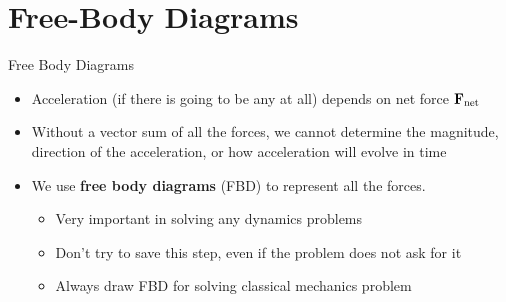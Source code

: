 \documentclass[12pt,compress,aspectratio=169]{beamer}
\newcommand{\pic}[2]{\texttt{[image: \#2]}}
\newcommand{\mb}[1]{\ensuremath\mathbf{#1}}
\newcommand{\eq}[2]{\vspace{#1}{\Large\begin{displaymath}#2\end{displaymath}}}
\begin{document}
%
%
%
%  
%



\section{Free-Body Diagrams}


\begin{frame}{Free Body Diagrams}
  \begin{itemize}
  \item Acceleration (if there is going to be any at all) depends
    on net force $\mb{F}_\mathrm{net}$
  \item Without a vector sum of all the forces, we cannot determine the
    magnitude, direction of the acceleration, or how acceleration will evolve
    in time
  \item We use \textbf{free body diagrams} (FBD) to represent all the forces.
    \begin{itemize}
    \item Very important in solving any dynamics problems
    \item Don't try to save this step, even if the problem does not ask for it
    \item Always draw FBD for solving classical mechanics problem
    \end{itemize}
  \end{itemize}
\end{frame}
\end{document}
